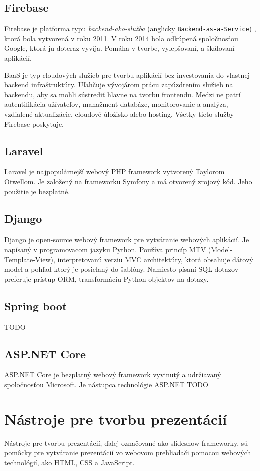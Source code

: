 \subsection{Firebase}
Firebase je platforma typu \textit{backend-ako-služba} (anglicky \texttt{Backend-as-a-Service}) , ktorá bola vytvorená v roku 2011. V roku 2014 bola odkúpená spoločnosťou Google, ktorá ju doteraz vyvíja. Pomáha v tvorbe, vylepšovaní, a škálovaní aplikácií.

BaaS je typ cloudových služieb pre tvorbu aplikácií bez investovania do vlastnej backend infraštruktúry. Uľahčuje vývojárom prácu zapúzdrením služieb na backendu, aby sa mohli sústrediť hlavne na tvorbu frontendu. Medzi ne patrí autentifikácia užívateľov, manažment databáze, monitorovanie a analýza, vzdialené aktualizácie, cloudové úložisko alebo hosting. Všetky tieto služby Firebase poskytuje. 

\subsection{Laravel}
Laravel je najpopulárnejší webový PHP framework vytvorený Taylorom Otwellom. Je založený na frameworku Symfony a má otvorený zrojový kód. Jeho použitie je bezplatné.

\subsection{Django}
Django je open-source webový framework pre vytváranie webových aplikácií. Je napísaný v programovacom jazyku Python. Používa princíp MTV (Model-Template-View), interpretovanú verziu MVC architektúry, ktorá obsahuje dátový model a pohľad ktorý je posielaný do šablóny. Namiesto písaní SQL dotazov preferuje prístup ORM, transformáciu Python objektov na dotazy.

\subsection{Spring boot}
TODO 

\subsection{ASP.NET Core}
ASP.NET Core je bezplatný webový framework vyvinutý a udržiavaný spoločnosťou Microsoft. Je nástupca technológie ASP.NET
TODO

\section{Nástroje pre tvorbu prezentácií}
Nástroje pre tvorbu prezentácií, ďalej označované ako slideshow frameworky, sú pomôcky pre vytváranie prezentácií vo webovom prehliadači pomocou webových technológií, ako HTML, CSS a JavaScript.

